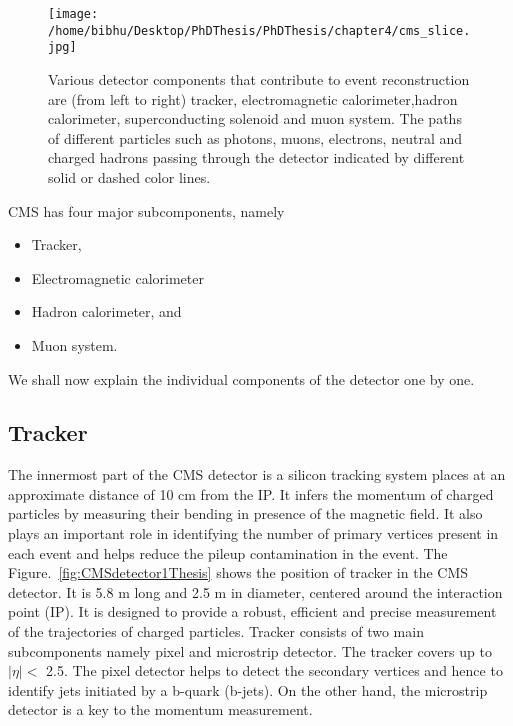 \begin{figure}[h]
    \centering  
    \texttt{[image: /home/bibhu/Desktop/PhDThesis/PhDThesis/chapter4/cms\_slice.jpg]}
    \caption{ \small Various detector components that contribute to event reconstruction are (from left to right) tracker, electromagnetic calorimeter,hadron calorimeter, superconducting solenoid and muon system. The paths of different particles  such as photons, muons, electrons, neutral and charged hadrons passing through the detector indicated by different solid or dashed color lines.}
    \label{fig:CMSdetector2}
\end{figure}
CMS has four major subcomponents, namely 

\begin{itemize}

\item Tracker,
\vspace{0.1cm} 
\item Electromagnetic calorimeter
\vspace{0.1cm} 
\item Hadron calorimeter, and 
\vspace{0.1cm} 
\item Muon system.


\end{itemize}

We shall now explain the individual components of the detector one by one. 


\subsection{Tracker}

The innermost part of the CMS detector is a silicon tracking system places at an approximate distance of 10 cm from the IP. It infers the momentum of charged particles by measuring their bending in presence of the magnetic field. It also plays an important role in identifying the number of primary vertices present in each event and helps reduce the pileup contamination in the event. The Figure.~\ref{fig:CMSdetector1Thesis} shows the position of tracker in the CMS detector. It is 5.8 m long and 2.5 m in diameter, centered around the interaction point (IP). It is designed to provide a robust, efficient and precise measurement of the  trajectories of charged particles. Tracker consists of  two main subcomponents namely pixel and microstrip detector. The tracker covers up to $|\eta| < $ 2.5.  The pixel detector helps to detect the secondary vertices and hence to identify jets initiated by a b-quark (b-jets). On the other hand, the microstrip detector is a key to the momentum measurement.



